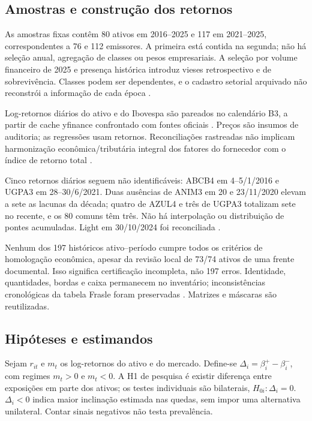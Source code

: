\subsection{Amostras e construção dos retornos}
As amostras fixas contêm 80 ativos em 2016--2025 e 117 em 2021--2025,
correspondentes a 76 e 112 emissores. A primeira está contida na segunda;
não há seleção anual, agregação de classes ou pesos empresariais. A seleção
por volume financeiro de 2025 e presença histórica introduz vieses
retrospectivo e de sobrevivência. Classes podem ser dependentes, e o cadastro
setorial arquivado não reconstrói a informação de cada época \cite{b3setorial}.

Log-retornos diários do ativo e do Ibovespa são pareados no calendário B3,
a partir de cache yfinance confrontado com fontes oficiais
\cite{yfinance,b3cotacoes,b3layout,b3empresas}. Preços são insumos de auditoria;
as regressões usam retornos. Reconciliações rastreadas não implicam
harmonização econômica/tributária integral dos fatores do fornecedor com
o índice de retorno total \cite{b3indices}.

Cinco retornos diários seguem não identificáveis: ABCB4 em 4--5/1/2016
e UGPA3 em 28--30/6/2021. Duas ausências de ANIM3 em 20 e 23/11/2020
elevam a sete as lacunas da década; quatro de AZUL4 e três de UGPA3
totalizam sete no recente, e os 80 comuns têm três. Não há interpolação
ou distribuição de pontes acumuladas. Light em 30/10/2024 foi reconciliada
\cite{abcb2015,ultra2021,light2024}.

Nenhum dos 197 históricos ativo--período cumpre todos os critérios de
homologação econômica, apesar da revisão local de 73/74 ativos de uma
frente documental. Isso significa certificação incompleta, não 197 erros.
Identidade, quantidades, bordas e caixa permanecem no inventário;
inconsistências cronológicas da tabela Frasle foram preservadas
\cite{frasinventario2026}. Matrizes e máscaras são reutilizadas.

\subsection{Hipóteses e estimandos}
Sejam $r_{it}$ e $m_t $ os log-retornos do ativo e do mercado.
Define-se $\Delta_i=\beta_i^+-\beta_i^-$, com regimes $m_t>0$ e $m_t<0$.
A H1 de pesquisa é existir diferença entre exposições em parte dos ativos;
os testes individuais são bilaterais, $H_{0i}:\Delta_i=0$.
$\Delta_i<0$ indica maior inclinação estimada nas quedas, sem impor
uma alternativa unilateral. Contar sinais negativos não testa prevalência.

